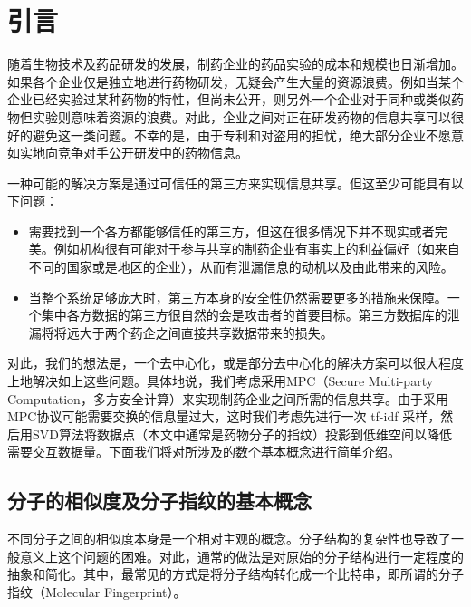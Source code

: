\chapter{引言}
\label{cha:intro}

随着生物技术及药品研发的发展，制药企业的药品实验的成本和规模也日渐增加。如果各个企业仅是独立地进行药物研发，无疑会产生大量的资源浪费。例如当某个企业已经实验过某种药物的特性，但尚未公开，则另外一个企业对于同种或类似药物但实验则意味着资源的浪费。对此，企业之间对正在研发药物的信息共享可以很好的避免这一类问题。不幸的是，由于专利和对盗用的担忧，绝大部分企业不愿意如实地向竞争对手公开研发中的药物信息。

一种可能的解决方案是通过可信任的第三方来实现信息共享。但这至少可能具有以下问题：
\begin{itemize}
	\item 需要找到一个各方都能够信任的第三方，但这在很多情况下并不现实或者完美。例如机构很有可能对于参与共享的制药企业有事实上的利益偏好（如来自不同的国家或是地区的企业），从而有泄漏信息的动机以及由此带来的风险。
	\item 当整个系统足够庞大时，第三方本身的安全性仍然需要更多的措施来保障。一个集中各方数据的第三方很自然的会是攻击者的首要目标。第三方数据库的泄漏将将远大于两个药企之间直接共享数据带来的损失。
\end{itemize}

对此，我们的想法是，一个去中心化，或是部分去中心化的解决方案可以很大程度上地解决如上这些问题。具体地说，我们考虑采用MPC（Secure Multi-party Computation，多方安全计算）来实现制药企业之间所需的信息共享。由于采用MPC协议可能需要交换的信息量过大，这时我们考虑先进行一次 tf-idf 采样，然后用SVD算法将数据点（本文中通常是药物分子的指纹）投影到低维空间\cite{Wan086033}以降低需要交互数据量。下面我们将对所涉及的数个基本概念进行简单介绍。

\section{分子的相似度及分子指纹的基本概念\cite{CERETOMASSAGUE201558}}

不同分子之间的相似度本身是一个相对主观的概念。分子结构的复杂性也导致了一般意义上这个问题的困难。对此，通常的做法是对原始的分子结构进行一定程度的抽象和简化。其中，最常见的方式是将分子结构转化成一个比特串，即所谓的分子指纹（Molecular Fingerprint）。

